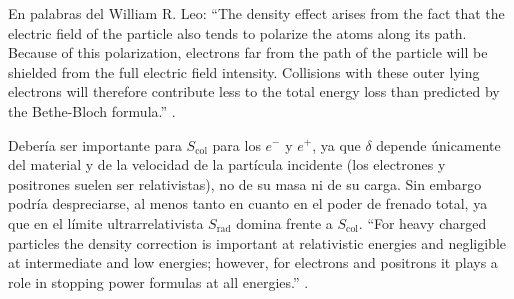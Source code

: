 \begin{enumerate}[label=\alph*)]
    En palabras del William R. Leo: ``The density effect arises from the fact that the electric field of the particle also tends  to polarize the atoms along its path. Because of this polarization, electrons far from the  path of the particle will be shielded from the full electric field intensity. Collisions with  these outer lying electrons will therefore contribute less to the total energy loss than  predicted by the Bethe-Bloch formula.'' \cite{Leo1994}.

    Debería ser importante para $S_{\text{col}}$ para los $e^-$ y $e^+$, ya que $\delta$ depende únicamente del material y de la velocidad de la partícula incidente (los electrones y positrones suelen ser relativistas), no de su masa ni de su carga. Sin embargo podría despreciarse, al menos tanto en cuanto en el poder de frenado total, ya que en el límite ultrarrelativista $S_{\text{rad}}$ domina frente a $S_{\text{col}}$.  ``For heavy charged particles the density correction is important at relativistic energies and negligible at intermediate and low energies; however, for electrons and positrons it plays a role in stopping power formulas at all energies.'' \cite{Podgorsak2022}.


\end{enumerate}
